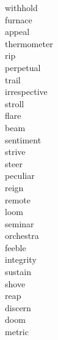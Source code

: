 \documentclass[a4paper, 11pt]{ctexart}
\begin{document}
\begin{multicols*}{3}
\begin{description}
\item[withhold]

\item[furnace]

\item[appeal]

\item[thermometer]

\item[rip]

\item[perpetual]

\item[trail]

\item[irrespective]

\item[stroll]

\item[flare]

\item[beam]

\item[sentiment]

\item[strive]

\item[steer]

\item[peculiar]

\item[reign]

\item[remote]

\item[loom]

\item[seminar]

\item[orchestra]

\item[feeble]

\item[integrity]

\item[sustain]

\item[shove]

\item[reap]

\item[discern]

\item[doom]

\item[metric]


\end{description}
\end{multicols*}
\end{document}
